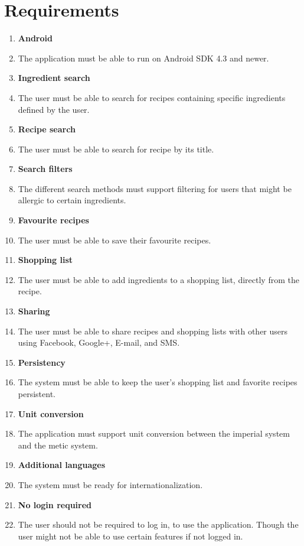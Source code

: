 \section{Requirements}
\begin{enumerate}
  \item\label{req:android} \textbf{Android} 
    \item [] The application must be able to run on Android SDK 4.3 and newer.
    
  \item\label{req:ingredientsearch} \textbf{Ingredient search} 
    \item [] The user must be able to search for recipes containing specific ingredients defined by the user.
    
  \item\label{req:recipesearch} \textbf{Recipe search} 
    \item [] The user must be able to search for recipe by its title.
    
  \item\label{req:searchfilters} \textbf{Search filters} 
    \item [] The different search methods must support filtering for users that might be allergic to certain ingredients.
    
  \item\label{req:favourite} \textbf{Favourite recipes} 
    \item [] The user must be able to save their favourite recipes.
    
  \item\label{req:shoppinglist} \textbf{Shopping list} 
    \item [] The user must be able to add ingredients to a shopping list, directly from the recipe.
    
  \item\label{req:sharing} \textbf{Sharing} 
    \item [] The user must be able to share recipes and shopping lists with other users using Facebook, Google+, E-mail, and SMS.
    
  \item\label{req:persistency} \textbf{Persistency} 
    \item [] The system must be able to keep the user's shopping list and favorite recipes persistent.
    
  \item\label{req:unitconversion} \textbf{Unit conversion} 
    \item [] The application must support unit conversion between the imperial system and the metic system.
    
  \item\label{req:additionallanguages} \textbf{Additional languages} 
    \item [] The system must be ready for internationalization.
  \item\label{req:Nologinrequired} \textbf{No login required}
    \item [] The user should not be required to log in, to use the application. Though the user might not be able to use certain features if not logged in.
\end{enumerate}